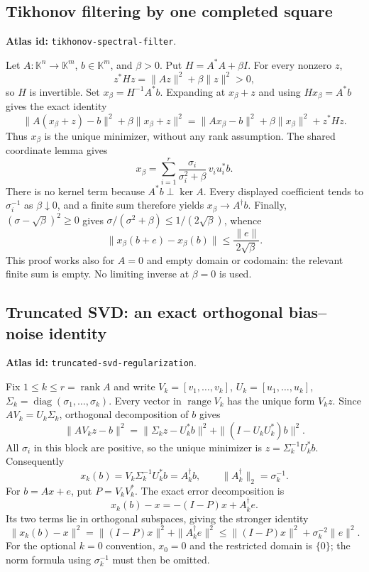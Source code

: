\documentclass[11pt,a4paper]{article}
\DeclareMathOperator{\diag}{diag}
\DeclareMathOperator{\rank}{rank}
\DeclareRobustCommand{\code}[1]{{\footnotesize\urlstyle{tt}\nolinkurl{#1}}}
\begin{document}
\subsection{Tikhonov filtering by one completed square}
\label{sec:eq-tikhonov}
\textbf{Atlas id:} \code{tikhonov-spectral-filter}.

Let $A:\mathbb K^n\to\mathbb K^m$, $b\in\mathbb K^m$, and $\beta>0$.
Put $H=A^*A+\beta I$. For every nonzero $z$,
\[
 z^*Hz=\|Az\|^2+\beta\|z\|^2>0,
\]
so $H$ is invertible. Set $x_\beta=H^{-1}A^*b$. Expanding at
$x_\beta+z$ and using $Hx_\beta=A^*b$ gives the exact identity
\begin{equation}\label{eq:eq-tikh-square}
 \|A(x_\beta+z)-b\|^2+\beta\|x_\beta+z\|^2
 =\|Ax_\beta-b\|^2+\beta\|x_\beta\|^2+z^*Hz.
\end{equation}
Thus $x_\beta$ is the unique minimizer, without any rank assumption.
The shared coordinate lemma gives
\[
 x_\beta=\sum_{i=1}^r
 \frac{\sigma_i}{\sigma_i^2+\beta}\,v_i u_i^*b.
\]
There is no kernel term because $A^*b\perp\ker A$. Every displayed
coefficient tends to $\sigma_i^{-1}$ as $\beta\downarrow0$, and a finite
sum therefore yields $x_\beta\to A^\dagger b$. Finally,
$(\sigma-\sqrt\beta)^2\ge0$ gives
$\sigma/(\sigma^2+\beta)\le1/(2\sqrt\beta)$, whence
\[
 \|x_\beta(b+e)-x_\beta(b)\|
 \le\frac{\|e\|}{2\sqrt\beta}.
\]
This proof works also for $A=0$ and empty domain or codomain: the relevant
finite sum is empty. No limiting inverse at $\beta=0$ is used.

\subsection{Truncated SVD: an exact orthogonal bias--noise identity}
\label{sec:eq-tsvd}
\textbf{Atlas id:} \code{truncated-svd-regularization}.

Fix $1\le k\le r=\rank A$ and write
$V_k=[v_1,\ldots,v_k]$, $U_k=[u_1,\ldots,u_k]$,
$\Sigma_k=\diag(\sigma_1,\ldots,\sigma_k)$. Every vector in
$\operatorname{range}V_k$ has the unique form $V_kz$. Since
$AV_k=U_k\Sigma_k$, orthogonal decomposition of $b$ gives
\[
 \|AV_kz-b\|^2
 =\|\Sigma_kz-U_k^*b\|^2+\|(I-U_kU_k^*)b\|^2.
\]
All $\sigma_i$ in this block are positive, so the unique minimizer is
$z=\Sigma_k^{-1}U_k^*b$. Consequently
\[
 x_k(b)=V_k\Sigma_k^{-1}U_k^*b=A_k^\dagger b,
 \qquad \|A_k^\dagger\|_2=\sigma_k^{-1}.
\]
For $b=Ax+e$, put $P=V_kV_k^*$. The exact error decomposition is
\[
 x_k(b)-x=-(I-P)x+A_k^\dagger e.
\]
Its two terms lie in orthogonal subspaces, giving the stronger identity
\[
 \|x_k(b)-x\|^2=\|(I-P)x\|^2+\|A_k^\dagger e\|^2
 \le\|(I-P)x\|^2+\sigma_k^{-2}\|e\|^2.
\]
For the optional $k=0$ convention, $x_0=0$ and the restricted domain is
$\{0\}$; the norm formula using $\sigma_k^{-1}$ must then be omitted.
\end{document}
